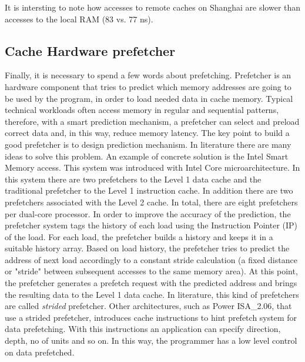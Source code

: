 It is intersting to note how  accesses to remote caches on Shanghai are slower than accesses to the local RAM (83 vs. 77 ns). 

\subsection{Cache Hardware prefetcher}

Finally, it is necessary to spend a few words about prefetching. Prefetcher is an hardware component that tries to predict which memory addresses are
going to be used by the program, in order to load needed data in cache memory.
Typical technical workloads often access memory in regular and sequential patterns, therefore, with a smart prediction mechanism, a prefetcher can select 
and preload correct data and, in this way, reduce memory latency. The key point to build a good prefetcher is to design prediction mechanism.
In literature there are many ideas to solve this problem. An example of concrete solution is the Intel Smart Memory access. This system was introduced
with Intel Core microarchitecture. In this system there are two prefetchers to the Level 1 data cache and the traditional prefetcher to the Level 1 
instruction cache. In addition there are two prefetchers associated with the Level 2 cache. In total, there are eight prefetchers per dual-core processor. 
In order to improve the accuracy of the prediction, the prefetcher system tags the history of each load using the Instruction Pointer (IP) of the load. 
For each load, the prefetcher builds a history and keeps it in a suitable history array. Based on load history, the prefetcher tries to predict the 
address of next load accordingly to a constant stride calculation (a fixed distance or "stride" between subsequent accesses to the same memory area). 
At this point, the prefetcher generates a prefetch request with the predicted address and brings the resulting data to the Level 1 data cache.
In literature, this kind of prefetchers are called \textit{strided} prefetcher.
Other architectures, such as Power ISA\_2.06, that use a strided prefetcher, introduces cache instructions to hint prefetch system for data prefetching.
With this instructions an application can specify direction, depth, no of units and so on. In this way, the programmer has a low level control on 
data prefetched.

